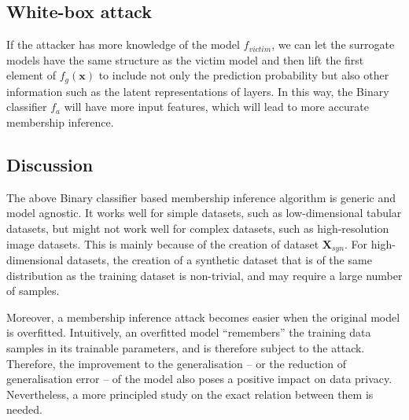 \subsection*{White-box attack}

If the attacker has more knowledge of the model $f_{victim}$, we can let the surrogate models have the same structure as the victim model and then lift the first element of $f_{g}(\textbf{x})$ to include not only the prediction probability but also other information such as the latent representations of layers. In this way, the Binary classifier $f_a$ will have more input features, which will lead to more accurate membership inference. 

\subsection*{Discussion} 

The above Binary classifier based membership inference algorithm is generic and model agnostic. It works well for simple datasets, such as low-dimensional tabular datasets, but might not work well for complex datasets, such as high-resolution image datasets. This is mainly because of the creation of dataset $\textbf{X}_{syn}$. For high-dimensional datasets, the creation of a synthetic dataset that is of the same distribution as the training dataset is non-trivial, and may require a large number of samples. 

Moreover, a membership inference attack becomes easier when the original model is overfitted. Intuitively, an overfitted model ``remembers'' the training data samples in its trainable parameters, and is therefore subject to the attack. Therefore, the improvement to the generalisation -- or the reduction of generalisation error -- of the model also poses a positive impact on data privacy. Nevertheless, a more principled study on the exact relation between them is needed. 



